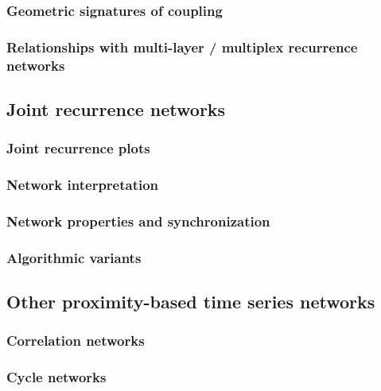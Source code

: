 		\subsubsection{Geometric signatures of coupling}

		\subsubsection{{\color{red}Relationships with multi-layer / multiplex
		recurrence networks}}

	\subsection{Joint recurrence networks}
		\subsubsection{Joint recurrence plots}
		\subsubsection{Network interpretation}
		\subsubsection{Network properties and synchronization}
		\subsubsection{Algorithmic variants}

	\subsection{Other proximity-based time series networks}
		\subsubsection{Correlation networks}
		\subsubsection{Cycle networks}
